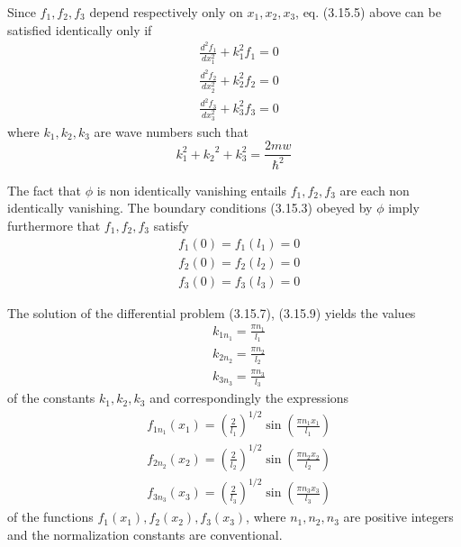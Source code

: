 \documentclass{article}
\begin{document}
Since $f_{1}, f_{2}, f_{3}$ depend respectively only on $x_{1}, x_{2}, x_{3}$, eq. (3.15.5) above can be satisfied identically only if
$$
\begin{align*}
& \frac{d^{2} f_{1}}{d x_{1}^{2}}+k_{1}^{2} f_{1}=0  \tag{3.15.7a}\\
& \frac{d^{2} f_{2}}{d x_{2}^{2}}+k_{2}^{2} f_{2}=0  \tag{3.15.7b}\\
& \frac{d^{2} f_{3}}{d x_{3}^{2}}+k_{3}^{2} f_{3}=0 \tag{3.15.7c}
\end{align*}
$$
where $k_{1}, k_{2}, k_{3}$ are wave numbers such that
$$
\begin{equation*}
k_{1}^{2}+{k_{2}}^{2}+k_{3}^{2}=\frac{2 m w}{\hbar^{2}} \tag{3.15.8}
\end{equation*}
$$

The fact that $\phi$ is non identically vanishing entails $f_{1}, f_{2}, f_{3}$ are each non identically vanishing. The boundary conditions (3.15.3) obeyed by $\phi$ imply furthermore that $f_{1}, f_{2}, f_{3}$ satisfy
$$
\begin{align*}
& f_{1}(0)=f_{1}\left(l_{1}\right)=0  \tag{3.15.9a}\\
& f_{2}(0)=f_{2}\left(l_{2}\right)=0  \tag{3.15.9b}\\
& f_{3}(0)=f_{3}\left(l_{3}\right)=0 \tag{3.15.9c}
\end{align*}
$$

The solution of the differential problem (3.15.7), (3.15.9) yields the values
$$
\begin{align*}
& k_{1 n_{1}}=\frac{\pi n_{1}}{l_{1}}  \tag{3.15.10a}\\
& k_{2 n_{2}}=\frac{\pi n_{2}}{l_{2}}  \tag{3.15.10b}\\
& k_{3 n_{3}}=\frac{\pi n_{3}}{l_{3}} \tag{3.15.10c}
\end{align*}
$$
of the constants $k_{1}, k_{2}, k_{3}$ and correspondingly the expressions
$$
\begin{align*}
& f_{1 n_{1}}\left(x_{1}\right)=\left(\frac{2}{l_{1}}\right)^{1 / 2} \sin \left(\frac{\pi n_{1} x_{1}}{l_{1}}\right)  \tag{3.15.11a}\\
& f_{2 n_{2}}\left(x_{2}\right)=\left(\frac{2}{l_{2}}\right)^{1 / 2} \sin \left(\frac{\pi n_{2} x_{2}}{l_{2}}\right)  \tag{3.15.11b}\\
& f_{3 n_{3}}\left(x_{3}\right)=\left(\frac{2}{l_{3}}\right)^{1 / 2} \sin \left(\frac{\pi n_{3} x_{3}}{l_{3}}\right) \tag{3.15.11c}
\end{align*}
$$
of the functions $f_{1}\left(x_{1}\right), f_{2}\left(x_{2}\right), f_{3}\left(x_{3}\right)$, where $n_{1}, n_{2}, n_{3}$ are positive integers and the normalization constants are conventional.
\end{document}
